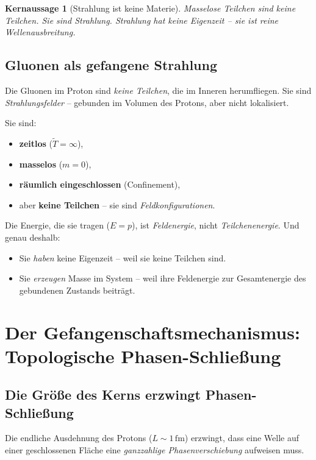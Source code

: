 \documentclass[11pt,a4paper]{article}
\newtheorem{keyresult}{Kernaussage}
\begin{document}
	\begin{keyresult}[Strahlung ist keine Materie]
		Masselose Teilchen sind keine Teilchen. Sie sind Strahlung. 
		Strahlung hat keine Eigenzeit -- sie ist reine Wellenausbreitung.
	\end{keyresult}
	
	\subsection{Gluonen als gefangene Strahlung}
	
	Die Gluonen im Proton sind \emph{keine Teilchen}, die im Inneren herumfliegen. 
	Sie sind \emph{Strahlungsfelder} -- gebunden im Volumen des Protons, aber nicht lokalisiert.
	
	Sie sind:
	\begin{itemize}
		\item \textbf{zeitlos} (\(\tilde{T} = \infty\)),
		\item \textbf{masselos} (\(m = 0\)),
		\item \textbf{räumlich eingeschlossen} (Confinement),
		\item aber \textbf{keine Teilchen} -- sie sind \emph{Feldkonfigurationen}.
	\end{itemize}
	
	Die Energie, die sie tragen (\(E = p\)), ist \emph{Feldenergie}, nicht \emph{Teilchenenergie}. 
	Und genau deshalb:
	\begin{itemize}
		\item Sie \emph{haben} keine Eigenzeit -- weil sie keine Teilchen sind.
		\item Sie \emph{erzeugen} Masse im System -- weil ihre Feldenergie zur Gesamtenergie des gebundenen Zustands beiträgt.
	\end{itemize}
	
	\section{Der Gefangenschaftsmechanismus: Topologische Phasen-Schließung}
	
	\subsection{Die Größe des Kerns erzwingt Phasen-Schließung}
	
	Die endliche Ausdehnung des Protons (\(L \sim 1\,\text{fm}\)) erzwingt, dass eine Welle auf einer geschlossenen Fläche eine \emph{ganzzahlige Phasenverschiebung} aufweisen muss.
	
\end{document}
